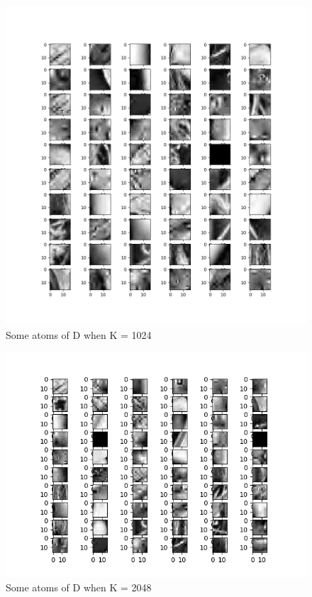 \documentclass[a4paper,10pt]{article}
\begin{document}
\begin{figure}[h]
 \centering
 \includegraphics[scale=0.3]{Results/Lenna/lenna_1024.png}
 \caption{Some atoms of D when K = 1024}
\end{figure}
\begin{figure}[h]
 \centering
 \includegraphics[scale=0.75]{Results/Lenna/lenna_2048.png}
 \caption{Some atoms of D when K = 2048}
\end{figure}
\newpage
\end{document}
